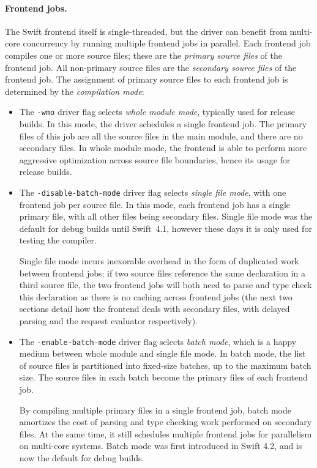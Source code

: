 \documentclass[../generics]{subfiles}
\begin{document}
\paragraph{Frontend jobs.}
The Swift frontend itself is single-threaded, but the driver can benefit from multi-core concurrency by running multiple frontend jobs in parallel. Each frontend job compiles one or more source files; these are the \emph{primary source files} of the frontend job. All non-primary source files are the \emph{secondary source files} of the frontend job. The assignment of primary source files to each frontend job is determined by the \emph{compilation mode}:
\begin{itemize}
\item The \texttt{-wmo} driver flag selects \emph{whole module mode}, typically used for release builds. In this mode, the driver schedules a single frontend job. The primary files of this job are all the source files in the main module, and there are no secondary files. In whole module mode, the frontend is able to perform more aggressive optimization across source file boundaries, hence its usage for release builds.
\item The \texttt{-disable-batch-mode} driver flag selects \emph{single file mode}, with one frontend job per source file. In this mode, each frontend job has a single primary file, with all other files being secondary files. Single file mode was the default for debug builds until Swift~4.1, however these days it is only used for testing the compiler.

Single file mode incurs inexorable overhead in the form of duplicated work between frontend jobs; if two source files reference the same declaration in a third source file, the two frontend jobs will both need to parse and type check this declaration as there is no caching across frontend jobs (the next two sections detail how the frontend deals with secondary files, with delayed parsing and the request evaluator respectively).

\item The \texttt{-enable-batch-mode} driver flag selects \emph{batch mode}, which is a happy medium between whole module and single file mode. In batch mode, the list of source files is partitioned into fixed-size batches, up to the maximum batch size. The source files in each batch become the primary files of each frontend job.

By compiling multiple primary files in a single frontend job, batch mode amortizes the cost of parsing and type checking work performed on secondary files. At the same time, it still schedules multiple frontend jobs for parallelism on multi-core systems. Batch mode was first introduced in Swift 4.2, and is now the default for debug builds.
\end{itemize}
\end{document}

